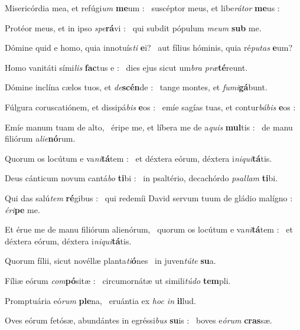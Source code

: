 \documentclass[12pt]{article} %
\newenvironment{psalmtext}{\leftskip 0.25in}{\vspace{2 mm}}
\let\oldgresixstar\gresixstar
\renewcommand{\gresixstar}{\textcolor{benred8}{\oldgresixstar}}
\let\oldgredagger\gredagger
\renewcommand{\gredagger}{\textcolor{benred8}{\oldgredagger}}
\begin{document}
\begin{psalmtext}
Misericórdia mea, et refúgi\emph{um} \textbf{me}um : \gresixstar\ suscéptor meus, et libe\emph{rátor} \textbf{me}us :

Protéor meus, et in ipso \emph{spe}\textbf{rá}vi : \gresixstar\ qui subdit pópulum \emph{meum} \textbf{sub} me.

Dómine quid e homo, quia innotuís\emph{ti} \textbf{e}i? \gresixstar\ aut fílius hóminis, quia ré\emph{putas} \textbf{e}um?

Homo vanitáti sími\emph{lis} \textbf{fac}tus e : \gresixstar\ dies ejus sicut um\emph{bra præ}\textbf{té}reunt.

Dómine inclína cælos tuos, et \emph{de}\textbf{scén}de : \gresixstar\ tange montes, et \emph{fumi}\textbf{gá}bunt.

Fúlgura coruscatiónem, et dissipá\emph{bis} \textbf{e}os : \gresixstar\ emíe sagías tuas, et contur\emph{bábis} \textbf{e}os :

Emíe manum tuam de alto, \gredagger\ éripe me, et líbera me de a\emph{quis} \textbf{mul}tis : \gresixstar\ de manu filiórum a\emph{lie}\textbf{nó}rum.

Quorum os locútum e va\emph{ni}\textbf{tá}tem : \gresixstar\ et déxtera eórum, déxtera i\emph{niqui}\textbf{tá}tis.

Deus cánticum novum cantá\emph{bo} \textbf{ti}bi : \gresixstar\ in psaltério, decachórdo \emph{psallam} \textbf{ti}bi.

Qui das salú\emph{tem} \textbf{ré}gibus : \gresixstar\ qui redemíi David servum tuum de gládio malígno : \emph{éri}\textbf{pe} me.

Et érue me de manu filiórum alienórum, \gredagger\ quorum os locútum e va\emph{ni}\textbf{tá}tem : \gresixstar\ et déxtera eórum, déxtera i\emph{niqui}\textbf{tá}tis.

Quorum fílii, sicut novéllæ planta\emph{ti}\textbf{ó}nes \gresixstar\ in juven\emph{túte} \textbf{su}a.

Fíliæ eórum \emph{com}\textbf{pó}sitæ : \gresixstar\ circumornátæ ut simili\emph{túdo} \textbf{tem}pli.

Promptuária eó\emph{rum} \textbf{ple}na, \gresixstar\ eruántia ex \emph{hoc in} \textbf{il}lud.

Oves eórum fetósæ, abundántes in egréssi\emph{bus} \textbf{su}is : \gresixstar\ boves e\emph{órum} \textbf{cras}sæ.


\end{psalmtext}
\end{document}
